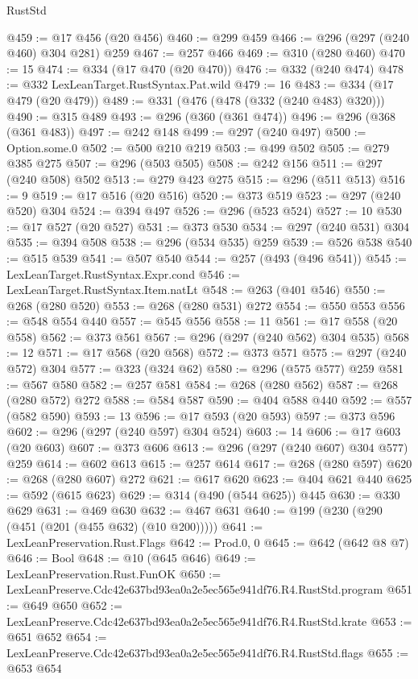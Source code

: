 \begin{lexlean}{RustStd}
\begin{coremodule}
@459 := @17 @456 (@20 @456)
@460 := @299 @459
@466 := @296 (@297 (@240 @460) @304 @281) @259
@467 := @257 @466
@469 := @310 (@280 @460)
@470 := 15
@474 := @334 (@17 @470 (@20 @470))
@476 := @332 (@240 @474)
@478 := @332 LexLeanTarget.RustSyntax.Pat.wild
@479 := 16
@483 := @334 (@17 @479 (@20 @479))
@489 := @331 (@476 (@478 (@332 (@240 @483) @320)))
@490 := @315 @489
@493 := @296 (@360 (@361 @474))
@496 := @296 (@368 (@361 @483))
@497 := @242 @148
@499 := @297 (@240 @497)
@500 := Option.some.{0}
@502 := @500 @210 @219
@503 := @499 @502
@505 := @279 @385 @275
@507 := @296 (@503 @505)
@508 := @242 @156
@511 := @297 (@240 @508) @502
@513 := @279 @423 @275
@515 := @296 (@511 @513)
@516 := 9
@519 := @17 @516 (@20 @516)
@520 := @373 @519
@523 := @297 (@240 @520) @304
@524 := @394 @497
@526 := @296 (@523 @524)
@527 := 10
@530 := @17 @527 (@20 @527)
@531 := @373 @530
@534 := @297 (@240 @531) @304
@535 := @394 @508
@538 := @296 (@534 @535) @259
@539 := @526 @538
@540 := @515 @539
@541 := @507 @540
@544 := @257 (@493 (@496 @541))
@545 := LexLeanTarget.RustSyntax.Expr.cond
@546 := LexLeanTarget.RustSyntax.Item.natLt
@548 := @263 (@401 @546)
@550 := @268 (@280 @520)
@553 := @268 (@280 @531) @272
@554 := @550 @553
@556 := @548 @554 @440
@557 := @545 @556
@558 := 11
@561 := @17 @558 (@20 @558)
@562 := @373 @561
@567 := @296 (@297 (@240 @562) @304 @535)
@568 := 12
@571 := @17 @568 (@20 @568)
@572 := @373 @571
@575 := @297 (@240 @572) @304
@577 := @323 (@324 @62)
@580 := @296 (@575 @577) @259
@581 := @567 @580
@582 := @257 @581
@584 := @268 (@280 @562)
@587 := @268 (@280 @572) @272
@588 := @584 @587
@590 := @404 @588 @440
@592 := @557 (@582 @590)
@593 := 13
@596 := @17 @593 (@20 @593)
@597 := @373 @596
@602 := @296 (@297 (@240 @597) @304 @524)
@603 := 14
@606 := @17 @603 (@20 @603)
@607 := @373 @606
@613 := @296 (@297 (@240 @607) @304 @577) @259
@614 := @602 @613
@615 := @257 @614
@617 := @268 (@280 @597)
@620 := @268 (@280 @607) @272
@621 := @617 @620
@623 := @404 @621 @440
@625 := @592 (@615 @623)
@629 := @314 (@490 (@544 @625)) @445
@630 := @330 @629
@631 := @469 @630
@632 := @467 @631
@640 := @199 (@230 (@290 (@451 (@201 (@455 @632) (@10 @200)))))
@641 := LexLeanPreservation.Rust.Flags
@642 := Prod.{0, 0}
@645 := @642 (@642 @8 @7)
@646 := Bool
@648 := @10 (@645 @646)
@649 := LexLeanPreservation.Rust.FunOK
@650 := LexLeanPreserve.Cdc42e637bd93ea0a2e5ec565e941df76.R4.RustStd.program
@651 := @649 @650
@652 := LexLeanPreserve.Cdc42e637bd93ea0a2e5ec565e941df76.R4.RustStd.krate
@653 := @651 @652
@654 := LexLeanPreserve.Cdc42e637bd93ea0a2e5ec565e941df76.R4.RustStd.flags
@655 := @653 @654

\end{coremodule}
\end{lexlean}
